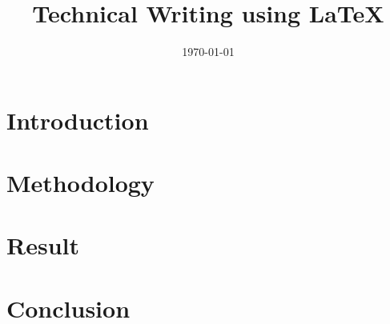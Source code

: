 \documentclass{article}
\begin{document}
	\title{Technical Writing using LaTeX}
	\author{}
	\date{\today}
	\maketitle
	\begin{abstract}
		\lipsum[1]
	\end{abstract}
	\section{Introduction}
		\lipsum[1-2]
	\section{Methodology}
		\lipsum[1]
	\section{Result}
		\lipsum[1]
	\section{Conclusion}
		\lipsum[1]
\end{document}
